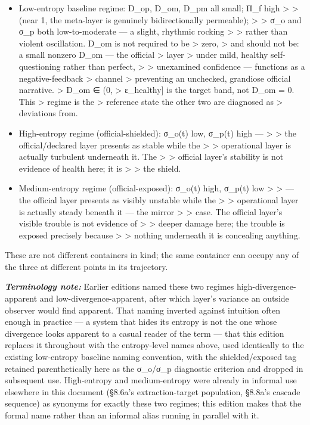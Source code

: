\documentclass[
]{article}
\begin{document}
\begin{itemize}
\item
  Low-entropy baseline regime: D\_op, D\_om, D\_pm all small; Π\_f high
  \textgreater{} \textgreater{} (near 1, the meta-layer is genuinely
  bidirectionally permeable); \textgreater{} \textgreater{} σ\_o and
  σ\_p both low-to-moderate --- a slight, rhythmic rocking
  \textgreater{} \textgreater{} rather than violent oscillation. D\_om
  is not required to be \textgreater{} zero, \textgreater{} and should
  not be: a small nonzero D\_om --- the official \textgreater{} layer
  \textgreater{} under mild, healthy self-questioning rather than
  perfect, \textgreater{} \textgreater{} unexamined confidence ---
  functions as a negative-feedback \textgreater{} channel \textgreater{}
  preventing an unchecked, grandiose official narrative. \textgreater{}
  D\_om ∈ (0, \textgreater{} ε\_healthy{]} is the target band, not D\_om
  = 0. This \textgreater{} regime is the \textgreater{} reference state
  the other two are diagnosed as \textgreater{} deviations from.
\item
  High-entropy regime (official-shielded): σ\_o(t) low, σ\_p(t) high ---
  \textgreater{} \textgreater{} the official/declared layer presents as
  stable while the \textgreater{} \textgreater{} operational layer is
  actually turbulent underneath it. The \textgreater{} \textgreater{}
  official layer's stability is not evidence of health here; it is
  \textgreater{} \textgreater{} the shield.
\item
  Medium-entropy regime (official-exposed): σ\_o(t) high, σ\_p(t) low
  \textgreater{} \textgreater{} --- the official layer presents as
  visibly unstable while the \textgreater{} \textgreater{} operational
  layer is actually steady beneath it --- the mirror \textgreater{}
  \textgreater{} case. The official layer's visible trouble is not
  evidence of \textgreater{} \textgreater{} deeper damage here; the
  trouble is exposed precisely because \textgreater{} \textgreater{}
  nothing underneath it is concealing anything.
\end{itemize}

These are not different containers in kind; the same container can
occupy any of the three at different points in its trajectory.

\emph{\textbf{Terminology note:}} Earlier editions named these two
regimes high-divergence-apparent and low-divergence-apparent, after
which layer's variance an outside observer would find apparent. That
naming inverted against intuition often enough in practice --- a system
that hides its entropy is not the one whose divergence looks apparent to
a casual reader of the term --- that this edition replaces it throughout
with the entropy-level names above, used identically to the existing
low-entropy baseline naming convention, with the shielded/exposed tag
retained parenthetically here as the σ\_o/σ\_p diagnostic criterion and
dropped in subsequent use. High-entropy and medium-entropy were already
in informal use elsewhere in this document (§8.6a's extraction-target
population, §8.8a's cascade sequence) as synonyms for exactly these two
regimes; this edition makes that the formal name rather than an informal
alias running in parallel with it.
\end{document}
